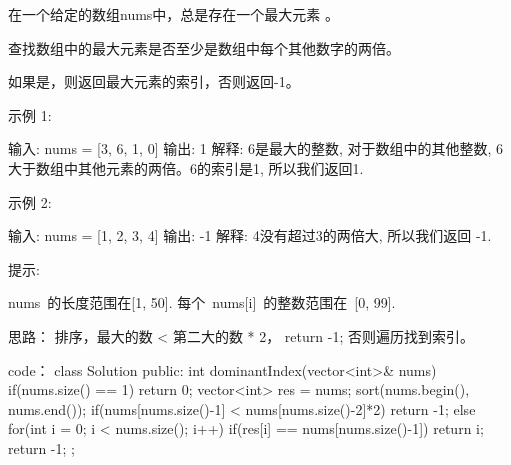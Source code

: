 在一个给定的数组nums中，总是存在一个最大元素 。

查找数组中的最大元素是否至少是数组中每个其他数字的两倍。

如果是，则返回最大元素的索引，否则返回-1。

示例 1:

输入: nums = [3, 6, 1, 0]
输出: 1
解释: 6是最大的整数, 对于数组中的其他整数,
6大于数组中其他元素的两倍。6的索引是1, 所以我们返回1.
 

示例 2:

输入: nums = [1, 2, 3, 4]
输出: -1
解释: 4没有超过3的两倍大, 所以我们返回 -1.
 

提示:

nums 的长度范围在[1, 50].
每个 nums[i] 的整数范围在 [0, 99].



























思路：
排序，最大的数 < 第二大的数 * 2， return -1; 否则遍历找到索引。



























code：
class Solution {
public:
    int dominantIndex(vector<int>& nums) {
        if(nums.size() == 1) return 0;
        vector<int> res = nums;
        sort(nums.begin(), nums.end());
        if(nums[nums.size()-1] < nums[nums.size()-2]*2)
            return -1;
        else
        {
            for(int i = 0; i < nums.size(); i++)
            {
                if(res[i] == nums[nums.size()-1])
                    return i;
            }
            return -1;
        }
    }
};
